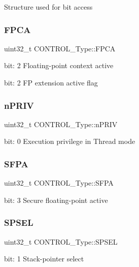 Structure used for bit access \mbox{\label{union_c_o_n_t_r_o_l___type_ac62cfff08e6f055e0101785bad7094cd}} 
\subsubsection{\texorpdfstring{FPCA}{FPCA}}
{\footnotesize\ttfamily uint32\+\_\+t C\+O\+N\+T\+R\+O\+L\+\_\+\+Type\+::\+F\+P\+CA}

bit\+: 2 Floating-\/point context active

bit\+: 2 FP extension active flag \mbox{\label{union_c_o_n_t_r_o_l___type_a35c1732cf153b7b5c4bd321cf1de9605}} 
\subsubsection{\texorpdfstring{nPRIV}{nPRIV}}
{\footnotesize\ttfamily uint32\+\_\+t C\+O\+N\+T\+R\+O\+L\+\_\+\+Type\+::n\+P\+R\+IV}

bit\+: 0 Execution privilege in Thread mode \mbox{\label{union_c_o_n_t_r_o_l___type_adab539fdfb991718401475bf6853669c}} 
\subsubsection{\texorpdfstring{SFPA}{SFPA}}
{\footnotesize\ttfamily uint32\+\_\+t C\+O\+N\+T\+R\+O\+L\+\_\+\+Type\+::\+S\+F\+PA}

bit\+: 3 Secure floating-\/point active \mbox{\label{union_c_o_n_t_r_o_l___type_a8cc085fea1c50a8bd9adea63931ee8e2}} 
\subsubsection{\texorpdfstring{SPSEL}{SPSEL}}
{\footnotesize\ttfamily uint32\+\_\+t C\+O\+N\+T\+R\+O\+L\+\_\+\+Type\+::\+S\+P\+S\+EL}

bit\+: 1 Stack-\/pointer select

